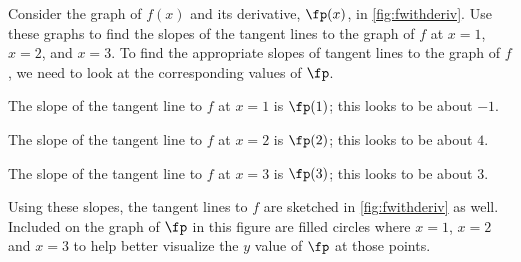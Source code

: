\begin{example}\label{ex_der_meaning4}
Consider the graph of $f(x)$ and its derivative, $\fp(x)$, in \autoref{fig:fwithderiv}.
Use these graphs to find the slopes of the tangent lines to the graph of $f$ at $x=1$, $x=2$, and $x=3$.%
\solution
To find the appropriate slopes of tangent lines to the graph of $f$, we need to look at the corresponding values of $\fp$.

The slope of the tangent line to $f$ at $x=1$ is $\fp(1)$; this looks to be about $-1$.

The slope of the tangent line to $f$ at $x=2$ is $\fp(2)$; this looks to be about $4$. 

The slope of the tangent line to $f$ at $x=3$ is $\fp(3)$; this looks to be about $3$. 

Using these slopes, the tangent lines to $f$ are sketched in \autoref{fig:fwithderiv} as well. Included on the graph of $\fp$ in this figure are filled circles where $x=1$, $x=2$ and $x=3$ to help better visualize the $y$ value of $\fp$ at those points.
\end{example}


